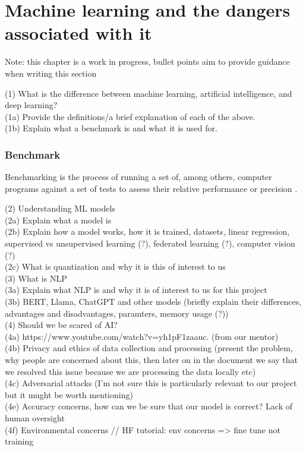 \documentclass[licencjacka,en]{pracamgr}
\begin{document}
\chapter{Machine learning and the dangers associated with it}
Note: this chapter is a work in progress, bullet points aim to provide guidance when writing this section

(1) What is the difference between machine learning, artificial intelligence, and deep learning? \\
(1a) Provide the definitions/a brief explanation of each of the above.\\
(1b) Explain what a benchmark is and what it is used for. \\

\subsection{Benchmark}
Benchmarking is the process of running a set of, among others, computer programs against a set of tests to assess their relative performance or precision \cite{benchmark}.

(2) Understanding ML models \\
(2a) Explain what a model is \\
(2b) Explain how a model works, how it is trained, datasets, linear regression, supervised vs unsupervised learning (?), federated learning (?), computer vision (?) \\
(2c) What is quantization and why it is this of interest to us \\

(3) What is NLP \\
(3a) Explain what NLP is and why it is of interest to us for this project \\
(3b) BERT, Llama, ChatGPT and other models (briefly explain their differences, advantages and disadvantages, paramters, memory usage (?)) \\

(4) Should we be scared of AI? \\
(4a) https://www.youtube.com/watch?v=yh1pF1zaauc. (from our mentor) \\
(4b) Privacy and ethics of data collection and processing (present the problem, why people are concerned about this, then later on in the document we say that we resolved this issue because we are processing the data locally etc) \\
(4c) Adversarial attacks (I'm not sure this is particularly relevant to our project but it mught be worth mentioning) \\
(4e) Accuracy concerns, how can we be sure that our model is correct? Lack of human oversight \\
(4f) Environmental concerns
// HF tutorial: env concerns => fine tune not training 
\end{document}
